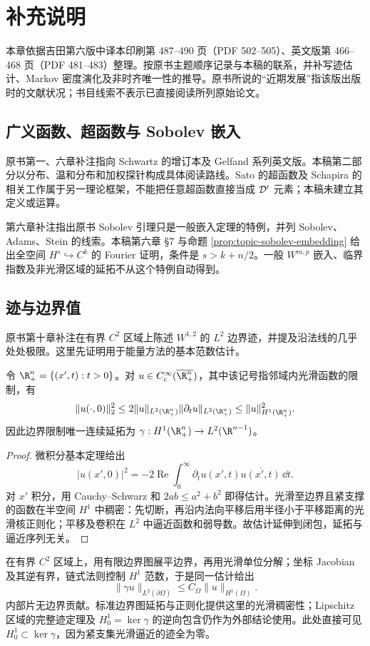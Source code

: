 \chapter{补充说明}\label{back:yosida-notes}
本章依据吉田第六版中译本印刷第 487--490 页（PDF 502--505）、英文版第 466--468 页（PDF 481--483）整理。按原书主题顺序记录与本稿的联系，并补写迹估计、Markov 密度演化及非时齐唯一性的推导。原书所说的“近期发展”指该版出版时的文献状况；书目线索不表示已直接阅读所列原始论文。

\section*{广义函数、超函数与 Sobolev 嵌入}
原书第一、六章补注指向 Schwartz 的增订本及 Gelfand 系列英文版。本稿第二部分以分布、温和分布和加权探针构成具体阅读路线。Sato 的超函数及 Schapira 的相关工作属于另一理论框架，不能把任意超函数直接当成 $\mathcal{D}'$ 元素；本稿未建立其定义或运算。

第六章补注指出原书 Sobolev 引理只是一般嵌入定理的特例，并列 Sobolev、Adams、Stein 的线索。本稿第六章 §7 与命题 \ref{prop:topic-sobolev-embedding} 给出全空间 $H^s\hookrightarrow C^k$ 的 Fourier 证明，条件是 $s>k+n/2$。一般 $W^{m,p}$ 嵌入、临界指数及非光滑区域的延拓不从这个特例自动得到。

\section*{迹与边界值}
\label{sec:supp-trace}
原书第十章补注在有界 $C^2$ 区域上陈述 $W^{1,2}$ 的 $L^2$ 边界迹，并提及沿法线的几乎处处极限。这里先证明用于能量方法的基本范数估计。
\begin{proposition}[半空间的迹估计]\label{prop:supp-trace}
令 $\R^n_+=\{(x',t):t>0\}$。对 $u\in C_c^\infty(\overline{\R^n_+})$，其中该记号指邻域内光滑函数的限制，有
\[
 \|u(\cdot,0)\|_2^2
 \le 2\|u\|_{L^2(\R^n_+)}\|\partial_tu\|_{L^2(\R^n_+)}
 \le \|u\|_{H^1(\R^n_+)}^2.
\]
因此边界限制唯一连续延拓为 $\gamma:H^1(\R^n_+)\to L^2(\R^{n-1})$。
\end{proposition}
\begin{proof}
微积分基本定理给出
\[
 |u(x',0)|^2=-2\operatorname{Re}\int_0^\infty
 \partial_tu(x',t)\overline{u(x',t)}\,\dd t.
\]
对 $x'$ 积分，用 Cauchy--Schwarz 和 $2ab\le a^2+b^2$ 即得估计。光滑至边界且紧支撑的函数在半空间 $H^1$ 中稠密：先切断，再沿内法向平移后用半径小于平移距离的光滑核正则化；平移及卷积在 $L^2$ 中逼近函数和弱导数。故估计延伸到闭包，延拓与逼近序列无关。
\end{proof}
在有界 $C^2$ 区域上，用有限边界图展平边界，再用光滑单位分解；坐标 Jacobian 及其逆有界，链式法则控制 $H^1$ 范数，于是同一估计给出
\[
 \|\gamma u\|_{L^2(\partial\Omega)}\le C_\Omega\|u\|_{H^1(\Omega)}.
\]
内部片无边界贡献。标准边界图延拓与正则化提供这里的光滑稠密性；Lipschitz 区域的完整迹定理及 $H_0^1=\ker\gamma$ 的逆向包含仍作为外部结论使用。此处直接可见 $H_0^1\subset\ker\gamma$，因为紧支集光滑逼近的迹全为零。

